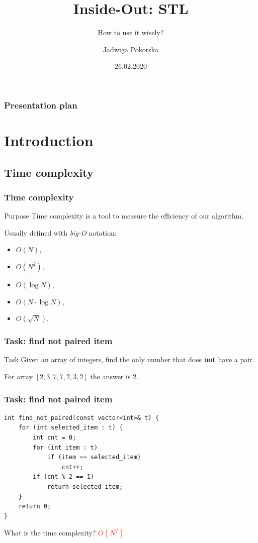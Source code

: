 \documentclass{beamer}
\title{Inside-Out: STL}
\subtitle{How to use it wisely?}
\author{Jadwiga Pokorska}
\institute{TietoEvry}
\date{26.02.2020}
\begin{document}

\begin{frame}
\titlepage
\end{frame}

\begin{frame}
\frametitle{Presentation plan}
\tableofcontents
\end{frame}

\section{Introduction}

\subsection{Time complexity}
\begin{frame}
    \frametitle{Time complexity}
    \begin{block}{Purpose}
    Time complexity is a tool to measure the efficiency of our algorithm.
    \end{block}

    \pause
    Usually defined with \textit{big-O} notation:
    \begin{itemize}
        \item $O(N)$,
        \item $O(N^2)$,
        \item $O(\log N)$,
        \item $O(N \cdot \log N)$,
        \item $O(\sqrt N)$,
    \end{itemize}
\end{frame}


\begin{frame}
    \frametitle{Task: find not paired item}
    \begin{block}{Task}
        Given an array of integers, find the only number that does \textbf{not}
        have a pair.
    \end{block}

    \pause
    \begin{example}
    For array $[2, 3, 7, 7, 2, 3, 2]$ the answer is $2$.
    \end{example}
\end{frame}

\begin{frame}[fragile]
    \frametitle{Task: find not paired item}
    \begin{verbatim}
int find_not_paired(const vector<int>& t) {
    for (int selected_item : t) {
        int cnt = 0;
        for (int item : t)
            if (item == selected_item)
                cnt++;
        if (cnt % 2 == 1)
            return selected_item;
    }
    return 0;
}\end{verbatim}

    \begin{block}{}
    What is the time complexity? \pause \textcolor{red}{$O(N^2)$}
    \end{block}
\end{frame}
\end{document}
